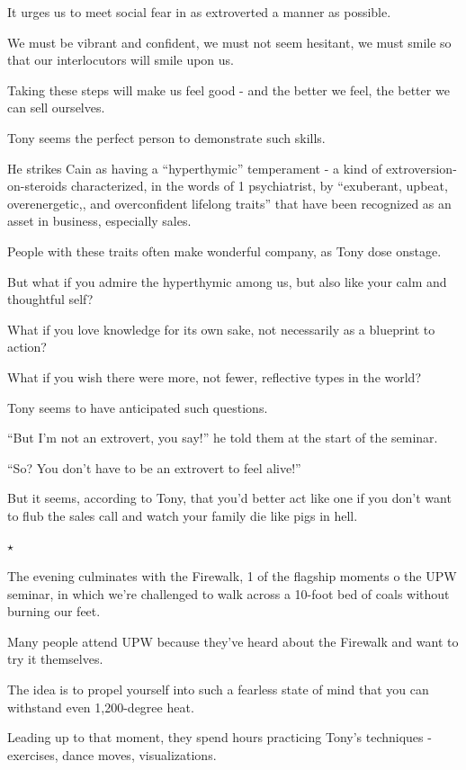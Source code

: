 \documentclass[oneside]{article}
\numberwithin{equation}{section}
\begin{document}
It urges us to meet social fear in as extroverted a manner as possible.

We must be vibrant and confident, we must not seem hesitant, we must smile so that our interlocutors will smile upon us.

Taking these steps will make us feel good - and the better we feel, the better we can sell ourselves.

%
Tony seems the perfect person to demonstrate such skills.

He strikes Cain as having a ``hyperthymic'' temperament - a kind of extroversion-on-steroids characterized, in the words of 1 psychiatrist, by ``exuberant, upbeat, overenergetic,, and overconfident lifelong traits'' that have been recognized as an asset in business, especially sales.

People with these traits often make wonderful company, as Tony dose onstage.

%
But what if you admire the hyperthymic among us, but also like your calm and thoughtful self?

What if you love knowledge for its own sake, not necessarily as a blueprint to action?


What if you wish there were more, not fewer, reflective types in the world?

%
Tony seems to have anticipated such questions.

``But I'm not an extrovert, you say!'' he told them at the start of the seminar.

``So? You don't have to be an extrovert to feel alive!''

%

But it seems, according to Tony, that you'd better act like one if you don't want to flub the sales call and watch your family die like pigs in hell.
\begin{center}
    $\star$
\end{center}
The evening culminates with the Firewalk, 1 of the flagship moments o the UPW seminar, in which we're challenged to walk across a 10-foot bed of coals without burning our feet.

Many people attend UPW because they've heard about the Firewalk and want to try it themselves.

The idea is to propel yourself into such a fearless state of mind that you can withstand even 1,200-degree heat.

%
Leading up to that moment, they spend hours practicing Tony's techniques - exercises, dance moves, visualizations.
\end{document}
